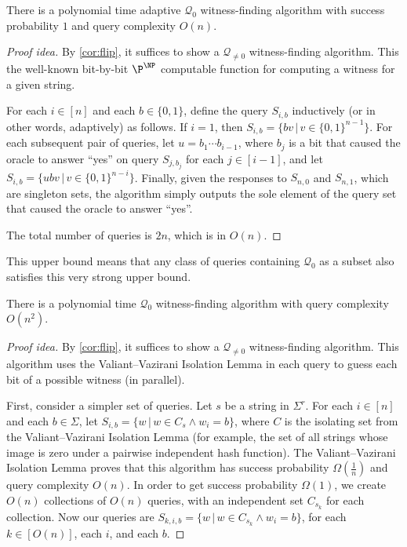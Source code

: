 \documentclass{article}
\newcommand{\mc}{\mathcal}
\begin{document}
\begin{theorem}\label{thm:naive}
  There is a polynomial time adaptive $\mc{Q}_0$ witness-finding algorithm with success probability $1$ and query complexity $O(n)$.
\end{theorem}
\begin{proof}[Proof idea]
  By \autoref{cor:flip}, it suffices to show a $\mc{Q}_{\neq 0}$ witness-finding algorithm.
  This the well-known bit-by-bit $\P^\NP$ computable function for computing a witness for a given string.

  For each $i \in [n]$ and each $b \in \{0, 1\}$, define the query $S_{i, b}$ inductively (or in other words, adaptively) as follows.
  If $i = 1$, then $S_{i, b} = \{ b v \, | \, v \in {\{0, 1\}}^{n - 1}\}$.
  For each subsequent pair of queries, let $u = b_1 \dotsb b_{i - 1}$, where $b_j$ is a bit that caused the oracle to answer ``yes'' on query $S_{j, b_j}$ for each $j \in [i - 1]$, and let $S_{i, b} = \{ u b v \, | \, v \in {\{0, 1\}}^{n - i}\}$.
  Finally, given the responses to $S_{n, 0}$ and $S_{n, 1}$, which are singleton sets, the algorithm simply outputs the sole element of the query set that caused the oracle to answer ``yes''.

  The total number of queries is $2n$, which is in $O(n)$.
\end{proof}

This upper bound means that any class of queries containing $\mc{Q}_0$ as a subset also satisfies this very strong upper bound.

\begin{theorem}\label{thm:vv}
  There is a polynomial time $\mc{Q}_0$ witness-finding algorithm with query complexity $O(n^2)$.
\end{theorem}
\begin{proof}[Proof idea]
  By \autoref{cor:flip}, it suffices to show a $\mc{Q}_{\neq 0}$ witness-finding algorithm.
  This algorithm uses the Valiant--Vazirani Isolation Lemma in each query to guess each bit of a possible witness (in parallel).

  First, consider a simpler set of queries.
  Let $s$ be a string in $\Sigma^r$.
  For each $i \in [n]$ and each $b \in \Sigma$, let $S_{i, b} = \{ w \, | \, w \in C_s \land w_i = b\}$, where $C$ is the isolating set from the Valiant--Vazirani Isolation Lemma (for example, the set of all strings whose image is zero under a pairwise independent hash function).
  The Valiant--Vazirani Isolation Lemma proves that this algorithm has success probability $\Omega(\frac{1}{n})$ and query complexity $O(n)$.
  In order to get success probability $\Omega(1)$, we create $O(n)$ collections of $O(n)$ queries, with an independent set $C_{s_k}$ for each collection.
  Now our queries are $S_{k, i, b} = \{ w \, | \, w \in C_{s_k} \land w_i = b\}$, for each $k \in \left[O(n)\right]$, each $i$, and each $b$.
\end{proof}
\end{document}
